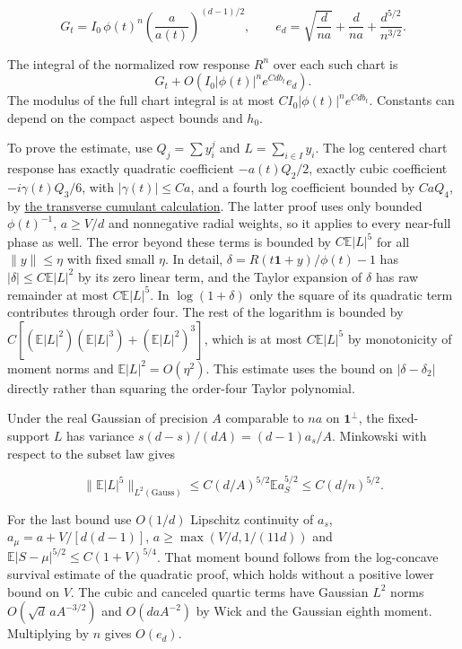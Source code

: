 \begin{equation*}
G_t=I_0\, \phi(t)^n\left(\frac{a}{a(t)}\right)^{(d-1)/2},\qquad
e_d=\sqrt{\frac d{na}}+\frac d{na}+\frac{d^{5/2}}{n^{3/2}}.
\end{equation*}

The integral of the normalized row response $R^n$ over each such chart is
\[G_t+O(I_0 |\phi(t)|^n e^{Cdb_t}e_d).\] The modulus of the full chart integral is at most $C I_0|\phi(t)|^n e^{Cdb_t}$. Constants can depend on the compact aspect bounds and $h_0$.

To prove the estimate, use $Q_j=\sum y_i^j$ and $L=\sum_{i\in I}y_i$. The log centered chart response has exactly quadratic coefficient $-a(t)Q_2/2$, exactly cubic coefficient $-i\gamma(t)Q_3/6$, with $|\gamma(t)|\le Ca$, and a fourth log coefficient bounded by $Ca Q_4$, by \hyperref[sec:fourth-transverse-cumulant]{the transverse cumulant calculation}. The latter proof uses only bounded $\phi(t)^{-1}$, $a\ge V/d$ and nonnegative radial weights, so it applies to every near-full phase as well. The error beyond these terms is bounded by $C\mathbb E|L|^5$ for all $\|y\|\le\eta$ with fixed small $\eta$. In detail, $\delta=R(t\mathbf1+y)/\phi(t)-1$ has $|\delta|\le C\mathbb E|L|^2$ by its zero linear term, and the Taylor expansion of $\delta$ has raw remainder at most $C\mathbb E|L|^5$. In $\log(1+\delta)$ only the square of its quadratic term contributes through order four. The rest of the logarithm is bounded by $C[(\mathbb E|L|^2)(\mathbb E|L|^3)+(\mathbb E|L|^2)^3]$, which is at most $C\mathbb E|L|^5$ by monotonicity of moment norms and $\mathbb E|L|^2=O(\eta^2)$. This estimate uses the bound on $|\delta-\delta_2|$ directly rather than squaring the order-four Taylor polynomial.

Under the real Gaussian of precision $A$ comparable to $na$ on $\mathbf1^\perp$, the fixed-support $L$ has variance $s(d-s)/(d A)=(d-1)a_s/A$. Minkowski with respect to the subset law gives

\begin{equation*}
\|\mathbb E|L|^5\|_{L^2(\mathrm{Gauss})}
\le C(d/A)^{5/2}\mathbb E a_S^{5/2}
\le C(d/n)^{5/2}.
\end{equation*}

For the last bound use $O(1/d)$ Lipschitz continuity of $a_s$, $a_\mu=a+V/[d(d-1)]$, $a\ge \max(V/d,1/(11d))$ and $\mathbb E|S-\mu|^{5/2}\le C(1+V)^{5/4}$. That moment bound follows from the log-concave survival estimate of the quadratic proof, which holds without a positive lower bound on $V$. The cubic and canceled quartic terms have Gaussian $L^2$ norms $O(\sqrt d\,a A^{-3/2})$ and $O(d a A^{-2})$ by Wick and the Gaussian eighth moment. Multiplying by $n$ gives $O(e_d)$.

